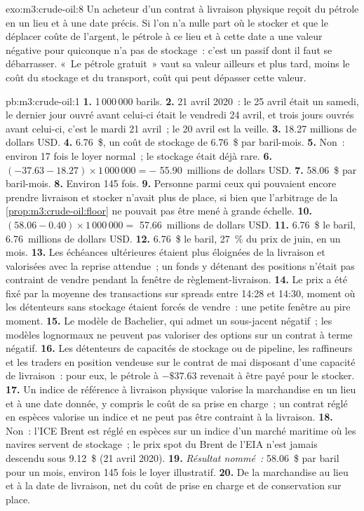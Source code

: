 \begin{solution}{exo:m3:crude-oil:8}
Un acheteur d'un contrat à livraison physique reçoit du pétrole en un lieu et à une date précis.
Si l'on n'a nulle part où le stocker et que le déplacer coûte de l'argent, le pétrole à ce lieu et
à cette date a une valeur négative pour quiconque n'a pas de stockage~: c'est un passif dont il faut
se débarrasser. «~Le pétrole gratuit~» vaut sa valeur ailleurs et plus tard, moins le coût du
stockage et du transport, coût qui peut dépasser cette valeur.
\end{solution}

\begin{solution}{pb:m3:crude-oil:1}
\textbf{1.} 1\,000\,000 barils. \textbf{2.} 21 avril 2020~: le 25 avril était un
samedi, le dernier jour ouvré avant celui-ci était le vendredi 24 avril, et trois jours ouvrés
avant celui-ci, c'est le mardi 21 avril~; le 20 avril est la veille. \textbf{3.} 18.27
millions de dollars USD. \textbf{4.} 6.76~\$, un coût de stockage de 6.76~\$ par baril-mois. \textbf{5.}
Non~: environ 17 fois le loyer normal~; le stockage était déjà rare.
\textbf{6.} $(-37.63 - 18.27) \times 1\,000\,000 = -$ 55.90~millions de dollars USD.
\textbf{7.} 58.06~\$ par baril-mois. \textbf{8.} Environ 145 fois. \textbf{9.}
Personne parmi ceux qui pouvaient encore prendre livraison et stocker n'avait plus de place, si bien que l'arbitrage
de la \cref{prop:m3:crude-oil:floor} ne pouvait pas être mené à grande échelle. \textbf{10.}
$(58.06 - 0.40) \times 1\,000\,000 = $ 57.66~millions de dollars USD.
\textbf{11.} 6.76~\$ le baril, 6.76~millions de dollars USD. \textbf{12.} 6.76~\$ le baril, 27~\%
du prix de juin, en un mois. \textbf{13.} Les échéances ultérieures étaient plus éloignées
de la livraison et valorisées avec la reprise attendue~; un fonds y détenant des positions n'était pas
contraint de vendre pendant la fenêtre de règlement-livraison. \textbf{14.} Le prix a été fixé par la moyenne des transactions sur spreads
entre 14:28 et 14:30, moment où les détenteurs sans stockage étaient forcés de vendre~: une petite
fenêtre au pire moment. \textbf{15.} Le modèle de Bachelier, qui admet un sous-jacent
négatif~; les modèles lognormaux ne peuvent pas valoriser des options sur un contrat à terme négatif.
\textbf{16.} Les détenteurs de capacités de stockage ou de pipeline, les raffineurs et les traders en position vendeuse sur le
contrat de mai disposant d'une capacité de livraison~: pour eux, le pétrole à $-\$37.63$ revenait à être payé pour le stocker.
\textbf{17.} Un indice de référence à livraison physique valorise la marchandise en un lieu et
à une date donnée, y compris le coût de sa prise en charge~; un contrat réglé en espèces valorise un indice et ne peut
pas être contraint à la livraison. \textbf{18.} Non~: l'ICE Brent est réglé en espèces sur un indice d'un
marché maritime où les navires servent de stockage~; le prix spot du Brent de l'EIA n'est jamais descendu sous
9.12~\$ (21 avril 2020). \textbf{19.} \emph{Résultat nommé~:} 58.06~\$ par baril pour un
mois, environ 145 fois le loyer illustratif. \textbf{20.} De la marchandise au
lieu et à la date de livraison, net du coût de prise en charge et de conservation sur place.
\end{solution}

